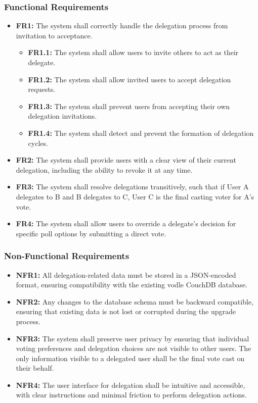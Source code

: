 \subsubsection{Functional Requirements}
\begin{itemize}
    \item \textbf{FR1:} The system shall correctly handle the delegation process from invitation to acceptance.
    \begin{itemize}
        \item \textbf{FR1.1:} The system shall allow users to invite others to act as their delegate.
        \item \textbf{FR1.2:} The system shall allow invited users to accept delegation requests.
        \item \textbf{FR1.3:} The system shall prevent users from accepting their own delegation invitations.
        \item \textbf{FR1.4:} The system shall detect and prevent the formation of delegation cycles.
    \end{itemize}

    \item \textbf{FR2:} The system shall provide users with a clear view of their current delegation, including the ability to revoke it at any time.

    \item \textbf{FR3:} The system shall resolve delegations transitively, such that if User A delegates to B and B delegates to C, User C is the final casting voter for A's vote.

    \item \textbf{FR4:} The system shall allow users to override a delegate's decision for specific poll options by submitting a direct vote.
\end{itemize}

\subsubsection{Non-Functional Requirements}
\begin{itemize}
    \item \textbf{NFR1:} All delegation-related data must be stored in a JSON-encoded format, ensuring compatibility with the existing vodle CouchDB database.
    \item \textbf{NFR2:} Any changes to the database schema must be backward compatible, ensuring that existing data is not lost or corrupted during the upgrade process.
    \item \textbf{NFR3:} The system shall preserve user privacy by ensuring that individual voting preferences and delegation choices are not visible to other users. The only information visible to a delegated user shall be the final vote cast on their behalf.
    \item \textbf{NFR4:} The user interface for delegation shall be intuitive and accessible, with clear instructions and minimal friction to perform delegation actions.
\end{itemize}

